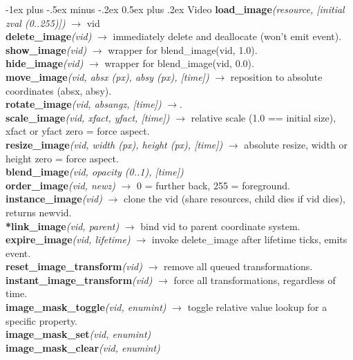 \documentclass[10pt,landscape]{article}
\makeatletter
\renewcommand{\section}{\@startsection{section}{1}{0mm}%
                                {-1ex plus -.5ex minus -.2ex}%
                                {0.5ex plus .2ex}%
                                {\normalfont\large\bfseries}}
\makeatother
\begin{document}
\begin{multicols}{3}
\section{Video}
	\textbf{load\_image}\emph{(resource, [initial zval (0..255)])} $\rightarrow$ vid\\
	\textbf{delete\_image}\emph{(vid)} $\rightarrow$ immediately delete and deallocate (won't emit event).\\
	\textbf{show\_image}\emph{(vid)} $\rightarrow$ wrapper for blend\_image(vid, 1.0).\\
	\textbf{hide\_image}\emph{(vid)} $\rightarrow$ wrapper for blend\_image(vid, 0.0).\\
	\textbf{move\_image}\emph{(vid, absx (px), absy (px), [time])} $\rightarrow$ reposition to absolute coordinates (absx, absy).\\
	\textbf{rotate\_image}\emph{(vid, absangz, [time])} $\rightarrow$.\\
	\textbf{scale\_image}\emph{(vid, xfact, yfact, [time])} $\rightarrow$ relative scale (1.0 == initial size), xfact or yfact zero = force aspect.\\
	\textbf{resize\_image}\emph{(vid, width (px), height (px), [time])} $\rightarrow$ absolute resize, width or height zero = force aspect.\\
	\textbf{blend\_image}\emph{(vid, opacity (0..1), [time])}\\
	\textbf{order\_image}\emph{(vid, newz)} $\rightarrow$ 0 = further back, 255 = foreground.\\
	\textbf{instance\_image}\emph{(vid)} $\rightarrow$ clone the vid (share resources, child dies if vid dies), returns newvid.\\
	\textbf{*link\_image}\emph{(vid, parent)} $\rightarrow$ bind vid to parent coordinate system.\\
	\textbf{expire\_image}\emph{(vid, lifetime)} $\rightarrow$ invoke delete\_image after lifetime ticks, emits event.\\
	\textbf{reset\_image\_transform}\emph{(vid)} $\rightarrow$ remove all queued transformations.\\
	\textbf{instant\_image\_transform}\emph{(vid)} $\rightarrow$ force all transformations, regardless of time.\\
	\textbf{image\_mask\_toggle}\emph{(vid, enumint)} $\rightarrow$ toggle relative value lookup for a specific property.\\
	\textbf{image\_mask\_set}\emph{(vid, enumint)}\\
	\textbf{image\_mask\_clear}\emph{(vid, enumint)}\\

\end{multicols}
\end{document}

